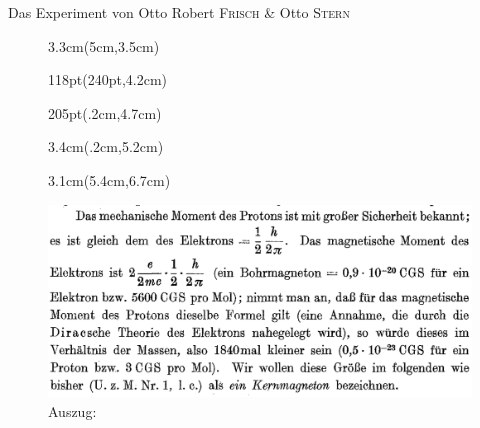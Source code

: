 \documentclass[t,9pt]{beamer}
\newcommand{\highlight}[3]{ \begin{textblock*}{#1}(#2,#3) \begin{tcolorbox} [enhanced,opacityfill=.1,colback=blue] \end{tcolorbox} \end{textblock*} } %
\begin{document}

        \begin{frame}{Das Experiment von Otto Robert \textsc{Frisch} \& Otto \textsc{Stern}}
                \begin{figure}
                        \highlight{3.3cm}{5cm}{3.5cm}
                        \highlight{118pt}{240pt}{4.2cm}
                        \highlight{205pt}{.2cm}{4.7cm}
                        \highlight{3.4cm}{.2cm}{5.2cm}
                        \highlight{3.1cm}{5.4cm}{6.7cm}
                        \includegraphics[width=\textwidth]{prosi_proton_als_dirac_teilchen.png}
                        \caption{Auszug:\cite{FrischStern1933}}
                \end{figure}
        \end{frame}
\end{document}
